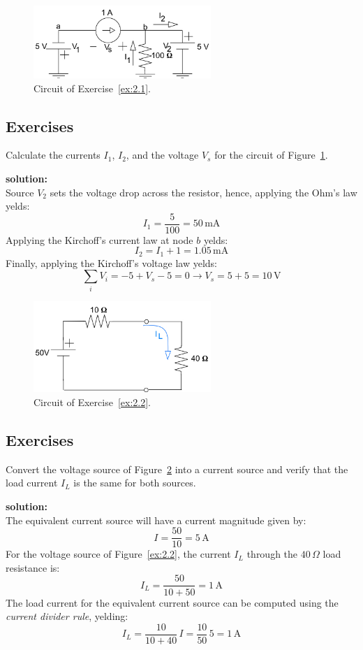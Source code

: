 \begin{figure}[h!]
  \centering
  \includegraphics[width=0.6\textwidth]{"images/Fig-15"}
  \caption{Circuit of Exercise~\ref{ex:2.1}.} 
  \label{Fig:Ex:2.1}
\end{figure}
\subsection*{Exercises}

\begin{exercise}
\label{ex:2.1}
Calculate the currents $I_1$, $I_2$, and the voltage $V_s$ for the circuit of Figure~\ref{Fig:Ex:2.1}.

\textbf{solution:}\\
Source $V_2$ sets the voltage drop across the resistor, hence, applying the Ohm's law yelds:
\[I_1=\frac{5}{100}= 50\,\textrm{mA}\]
Applying the Kirchoff's current law at node $b$ yelds:
\[I_2 = I_1 + 1 = 1.05\,\textrm{mA}\]
Finally, applying the Kirchoff's voltage law yelds:
\[\sum_i V_i = -5 + V_s - 5 = 0 \longrightarrow V_s = 5 + 5 = 10\,\textrm{V}\]
\end{exercise} 

\begin{figure}[h!]
  \centering
  \includegraphics[width=0.6\textwidth]{"images/Fig-16"}
  \caption{Circuit of Exercise~\ref{ex:2.2}.} 
  \label{Fig:Ex:2.2}
\end{figure}
\subsection*{Exercises}

\begin{exercise}
\label{ex:2.2}
Convert the voltage source of Figure~\ref{Fig:Ex:2.2} into a current source and verify that the load current $I_L$ is the same for both sources.

\textbf{solution:}\\
The equivalent current source will have a current magnitude given by:
\[I = \frac{50}{10} = 5\,\textrm{A}\] 
For the voltage source of Figure~\ref{ex:2.2}, the current $I_L$ through the $40\,\Omega$ load resistance is:
\[I_L = \frac{50}{10 + 50} =1\,\textrm{A}\]
The load current for the equivalent current source can be computed using the \emph{current divider rule}, yelding:
\[I_L=\frac{10}{10 + 40}\,I = \frac{10}{50}\,5= 1\,\textrm{A}\]
\end{exercise}


